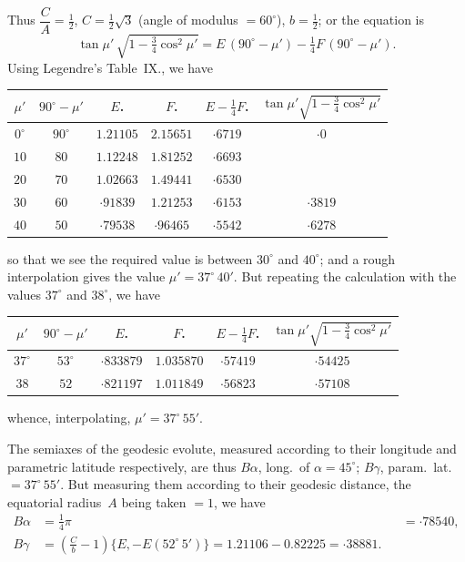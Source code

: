 \documentclass[11pt,a4paper]{article}
\theoremstyle{plain}
\theoremstyle{definition}
\begin{document}
Thus $\dfrac{C}{A} = \tfrac{1}{2}$, $C = \tfrac{1}{2}\sqrt{3}$ (angle of modulus $= 60^\circ$), $b = \tfrac{1}{2}$; or the equation is
\[
\tan\mu'\,\sqrt{1 - \tfrac{3}{4}\cos^2\mu'}
= E\,(90^\circ-\mu') - \tfrac{1}{4}F\,(90^\circ-\mu').
\]
Using Legendre's Table~IX., we have
\begin{center}
\begin{tabular}{c|c|c|c|c|c}
\toprule
$\mu'$ & $90^\circ-\mu'$ & $E$. & $F$. & $E-\tfrac{1}{4}F$. & $\tan\mu'\sqrt{1-\tfrac{3}{4}\cos^2\mu'}$ \\
\midrule
 $0^\circ$  & $90^\circ$ & $1.21105$ & $2.15651$ & $\cdot 6719$ & $\cdot 0$ \\
$10$  & $80$  & $1.12248$ & $1.81252$ & $\cdot 6693$ & \\
$20$  & $70$  & $1.02663$ & $1.49441$ & $\cdot 6530$ & \\
$30$  & $60$  & $\cdot 91839$ & $1.21253$ & $\cdot 6153$ & $\cdot 3819$ \\
$40$  & $50$  & $\cdot 79538$ & $\cdot 96465$ & $\cdot 5542$ & $\cdot 6278$ \\
\bottomrule
\end{tabular}
\end{center}
so that we see the required value is between $30^\circ$ and $40^\circ$; and a rough interpolation
gives the value $\mu' = 37^\circ\,40'$.  But repeating the calculation with the values $37^\circ$ and
$38^\circ$, we have
\begin{center}
\begin{tabular}{c|c|c|c|c|c}
\toprule
$\mu'$ & $90^\circ-\mu'$ & $E$. & $F$. & $E-\tfrac{1}{4}F$. & $\tan\mu'\sqrt{1-\tfrac{3}{4}\cos^2\mu'}$ \\
\midrule
 $37^\circ$ & $53^\circ$ & $\cdot 833879$ & $1.035870$ & $\cdot 57419$ & $\cdot 54425$ \\
$38$  & $52$  & $\cdot 821197$ & $1.011849$ & $\cdot 56823$ & $\cdot 57108$ \\
\bottomrule
\end{tabular}
\end{center}
whence, interpolating, $\mu' = 37^\circ\,55'$.

\clearpage

The semiaxes of the geodesic evolute, measured according to their longitude and
parametric latitude respectively, are thus $B\alpha$, long.\ of $\alpha = 45^\circ$; $B\gamma$, param.\ lat.
$= 37^\circ\,55'$.  But measuring them according to their geodesic distance, the equatorial
radius~$A$ being taken $=1$, we have
\begin{align*}
B\alpha &= \tfrac{1}{4}\pi &&= \cdot 78540, \\
B\gamma &= \left(\frac{C}{b}-1\right)\{E, - E(52^\circ\,5')\} = 1.21106 - 0.82225 = \cdot 38881.
\end{align*}
\end{document}
